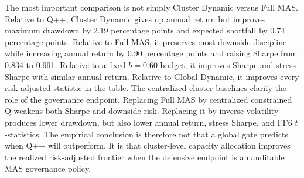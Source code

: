 \documentclass[sigconf,nonacm]{acmart}
\begin{document}
\begin{table}[t]
\centering
\caption{Main performance. Net Sharpe uses the 10/2 bps proxy cost; stress Sharpe uses the 25/5 bps cost.}
\label{tab:main}
\scriptsize
\setlength{\tabcolsep}{2.0pt}
\end{table}

The most important comparison is not simply Cluster Dynamic versus Full MAS. Relative to Q++, Cluster Dynamic gives up annual return but improves maximum drawdown by 2.19 percentage points and expected shortfall by 0.74 percentage points. Relative to Full MAS, it preserves most downside discipline while increasing annual return by 0.90 percentage points and raising Sharpe from 0.834 to 0.991. Relative to a fixed \(b=0.60\) budget, it improves Sharpe and stress Sharpe with similar annual return. Relative to Global Dynamic, it improves every risk-adjusted statistic in the table. The centralized cluster baselines clarify the role of the governance endpoint. Replacing Full MAS by centralized constrained Q weakens both Sharpe and downside risk. Replacing it by inverse volatility produces lower drawdown, but also lower annual return, stress Sharpe, and FF6 \(t\)-statistics. The empirical conclusion is therefore not that a global gate predicts when Q++ will outperform. It is that cluster-level capacity allocation improves the realized risk-adjusted frontier when the defensive endpoint is an auditable MAS governance policy.
\end{document}
